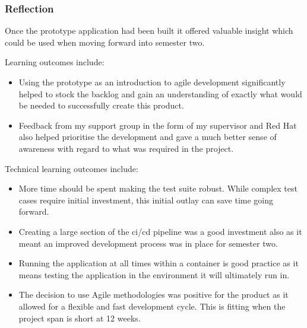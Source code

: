 \subsubsection{Reflection}
Once the prototype application had been built it offered valuable insight which could be used when moving forward into semester two.

Learning outcomes include:
\begin{itemize}
	\item Using the prototype as an introduction to agile development significantly helped to stock the \gls{backlog} and gain an understanding of exactly what would be needed to successfully create this product.
	\item Feedback from my support group in the form of my supervisor and Red Hat also helped prioritise the development and gave a much better sense of awareness with regard to what was required in the project.
\end{itemize}

Technical learning outcomes include:
\begin{itemize}
	\item More time should be spent making the test suite robust. While complex test cases require initial investment, this initial outlay can save time going forward.
	\item Creating a large section of the \gls{ci/cd} pipeline was a good investment also as it meant an improved development process was in place for semester two.
	\item Running the application at all times within a container is good practice as it means testing the application in the environment it will ultimately run in.
	\item The decision to use Agile methodologies was positive for the product as it allowed for a flexible and fast development cycle. This is fitting when the project span is short at 12 weeks.
\end{itemize}
